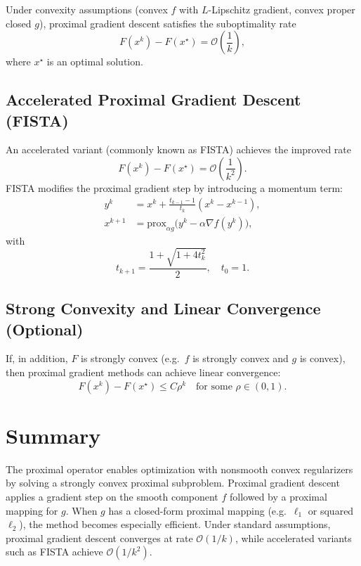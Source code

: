 \documentclass[11pt]{article}
\begin{document}
Under convexity assumptions (convex $f$ with $L$-Lipschitz gradient, convex proper closed $g$), proximal gradient descent satisfies the suboptimality rate
\begin{equation}
F(x^k) - F(x^\star) = \mathcal{O}\left(\frac{1}{k}\right),
\end{equation}
where $x^\star$ is an optimal solution.

\subsection{Accelerated Proximal Gradient Descent (FISTA)}

An accelerated variant (commonly known as FISTA) achieves the improved rate
\begin{equation}
F(x^k) - F(x^\star) = \mathcal{O}\left(\frac{1}{k^2}\right).
\end{equation}
FISTA modifies the proximal gradient step by introducing a momentum term:
\begin{align}
y^k &= x^k + \frac{t_{k-1}-1}{t_k}(x^k - x^{k-1}),\\
x^{k+1} &= \mathrm{prox}_{\alpha g}\bigl(y^k - \alpha\nabla f(y^k)\bigr),
\end{align}
with
\begin{equation}
t_{k+1} = \frac{1+\sqrt{1+4t_k^2}}{2},
\quad t_0 = 1.
\end{equation}

\subsection{Strong Convexity and Linear Convergence (Optional)}

If, in addition, $F$ is strongly convex (e.g.\ $f$ is strongly convex and $g$ is convex), then proximal gradient methods can achieve linear convergence:
\begin{equation}
F(x^k) - F(x^\star) \le C\rho^k
\quad \text{for some } \rho\in(0,1).
\end{equation}

\section{Summary}

The proximal operator enables optimization with nonsmooth convex regularizers by solving a strongly convex proximal subproblem. Proximal gradient descent applies a gradient step on the smooth component $f$ followed by a proximal mapping for $g$. When $g$ has a closed-form proximal mapping (e.g.\ $\ell_1$ or squared $\ell_2$), the method becomes especially efficient. Under standard assumptions, proximal gradient descent converges at rate $\mathcal{O}(1/k)$, while accelerated variants such as FISTA achieve $\mathcal{O}(1/k^2)$.
\end{document}
